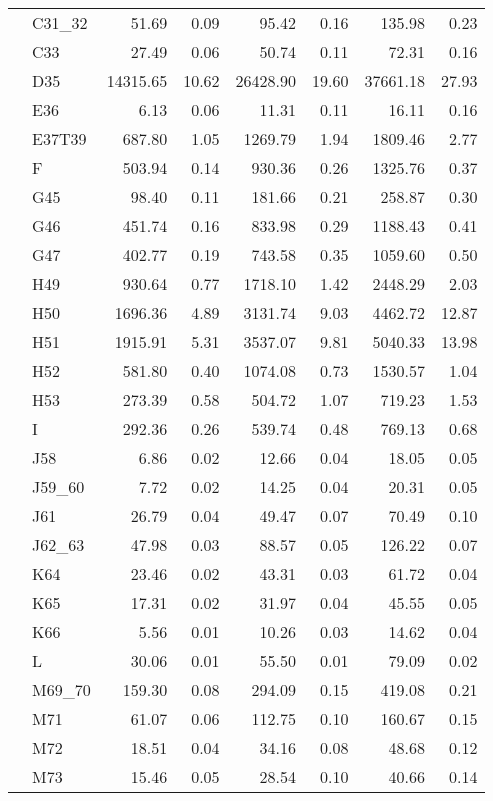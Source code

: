 \begin{tabular}{llrrrrrr}
 & C31\_32 & 51.69 & 0.09 & 95.42 & 0.16 & 135.98 & 0.23 \\
 & C33 & 27.49 & 0.06 & 50.74 & 0.11 & 72.31 & 0.16 \\
 & D35 & 14315.65 & 10.62 & 26428.90 & 19.60 & 37661.18 & 27.93 \\
 & E36 & 6.13 & 0.06 & 11.31 & 0.11 & 16.11 & 0.16 \\
 & E37T39 & 687.80 & 1.05 & 1269.79 & 1.94 & 1809.46 & 2.77 \\
 & F & 503.94 & 0.14 & 930.36 & 0.26 & 1325.76 & 0.37 \\
 & G45 & 98.40 & 0.11 & 181.66 & 0.21 & 258.87 & 0.30 \\
 & G46 & 451.74 & 0.16 & 833.98 & 0.29 & 1188.43 & 0.41 \\
 & G47 & 402.77 & 0.19 & 743.58 & 0.35 & 1059.60 & 0.50 \\
 & H49 & 930.64 & 0.77 & 1718.10 & 1.42 & 2448.29 & 2.03 \\
 & H50 & 1696.36 & 4.89 & 3131.74 & 9.03 & 4462.72 & 12.87 \\
 & H51 & 1915.91 & 5.31 & 3537.07 & 9.81 & 5040.33 & 13.98 \\
 & H52 & 581.80 & 0.40 & 1074.08 & 0.73 & 1530.57 & 1.04 \\
 & H53 & 273.39 & 0.58 & 504.72 & 1.07 & 719.23 & 1.53 \\
 & I & 292.36 & 0.26 & 539.74 & 0.48 & 769.13 & 0.68 \\
 & J58 & 6.86 & 0.02 & 12.66 & 0.04 & 18.05 & 0.05 \\
 & J59\_60 & 7.72 & 0.02 & 14.25 & 0.04 & 20.31 & 0.05 \\
 & J61 & 26.79 & 0.04 & 49.47 & 0.07 & 70.49 & 0.10 \\
 & J62\_63 & 47.98 & 0.03 & 88.57 & 0.05 & 126.22 & 0.07 \\
 & K64 & 23.46 & 0.02 & 43.31 & 0.03 & 61.72 & 0.04 \\
 & K65 & 17.31 & 0.02 & 31.97 & 0.04 & 45.55 & 0.05 \\
 & K66 & 5.56 & 0.01 & 10.26 & 0.03 & 14.62 & 0.04 \\
 & L & 30.06 & 0.01 & 55.50 & 0.01 & 79.09 & 0.02 \\
 & M69\_70 & 159.30 & 0.08 & 294.09 & 0.15 & 419.08 & 0.21 \\
 & M71 & 61.07 & 0.06 & 112.75 & 0.10 & 160.67 & 0.15 \\
 & M72 & 18.51 & 0.04 & 34.16 & 0.08 & 48.68 & 0.12 \\
 & M73 & 15.46 & 0.05 & 28.54 & 0.10 & 40.66 & 0.14 \\

\end{tabular}

